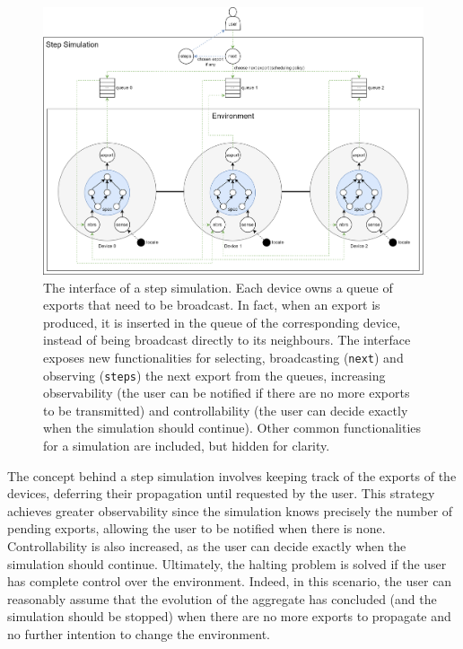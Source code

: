 \begin{figure}[!ht]
  \centering
  \includegraphics[width=1\textwidth]{resources/figures/step-simulation.png}
  \caption{The interface of a step simulation. Each device owns a queue of
    exports that need to be broadcast. In fact, when an export is produced, it
    is inserted in the queue of the corresponding device, instead of being
    broadcast directly to its neighbours. The interface exposes new
    functionalities for selecting, broadcasting (\texttt{next}) and observing
    (\texttt{steps}) the next export from the queues, increasing observability
    (the user can be notified if there are no more exports to be transmitted)
    and controllability (the user can decide exactly when the simulation should
    continue). Other common functionalities for a simulation are included, but
    hidden for clarity.}
  \label{figure:step-simulation}
\end{figure}

The concept behind a step simulation involves keeping track of the exports of
the devices, deferring their propagation until requested by the user. This
strategy achieves greater observability since the simulation knows precisely
the number of pending exports, allowing the user to be notified when there is
none. Controllability is also increased, as the user can decide exactly when
the simulation should continue. Ultimately, the halting problem is solved if
the user has complete control over the environment. Indeed, in this scenario,
the user can reasonably assume that the evolution of the aggregate has
concluded (and the simulation should be stopped) when there are no more exports
to propagate and no further intention to change the environment.


